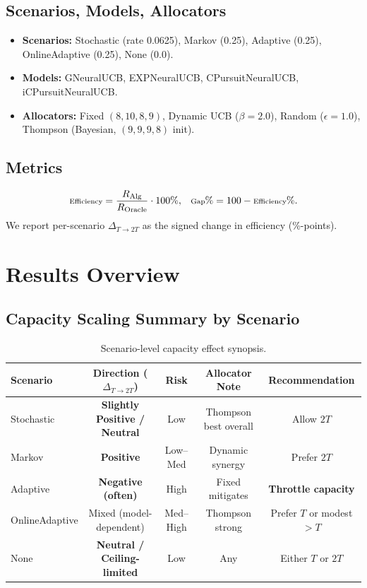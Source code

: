 \documentclass[11pt,a4paper]{article}
\newcommand{\critical}[1]{\textcolor{criticalcolor}{\textbf{#1}}}
\newcommand{\success}[1]{\textcolor{successcolor}{\textbf{#1}}}
\begin{document}
\subsection{Scenarios, Models, Allocators}
\begin{itemize}
    \item \textbf{Scenarios:} Stochastic (rate 0.0625), Markov (0.25), Adaptive (0.25), OnlineAdaptive (0.25), None (0.0).
    \item \textbf{Models:} GNeuralUCB, EXPNeuralUCB, CPursuitNeuralUCB, iCPursuitNeuralUCB.
    \item \textbf{Allocators:} Fixed $(8,10,8,9)$, Dynamic UCB ($\beta\!=\!2.0$), Random ($\epsilon\!=\!1.0$), Thompson (Bayesian, $(9,9,9,8)$ init).
\end{itemize}

\subsection{Metrics}
\begin{equation}
\scriptsize
\text{Efficiency} = \frac{R_{\text{Alg}}}{R_{\text{Oracle}}}\cdot 100\%,\quad
\text{Gap}\% = 100 - \text{Efficiency}\%.
\end{equation}
We report per-scenario \textbf{$\Delta_{T\rightarrow 2T}$} as the signed change in efficiency (\%-points).

\section{Results Overview}

\subsection{Capacity Scaling Summary by Scenario}
\begin{table}[H]
\centering
\scriptsize
\begin{tabular}{lcccc}
\toprule
\textbf{Scenario} & \textbf{Direction ($\Delta_{T\rightarrow 2T}$)} & \textbf{Risk} & \textbf{Allocator Note} & \textbf{Recommendation}\\
\midrule
Stochastic & \success{Slightly Positive / Neutral} & Low & Thompson best overall & Allow $2T$ \\
Markov & \success{Positive} & Low--Med & Dynamic synergy & Prefer $2T$ \\
Adaptive & \critical{Negative (often)}} & High & Fixed mitigates & \textbf{Throttle capacity} \\
OnlineAdaptive & Mixed (model-dependent) & Med--High & Thompson strong & Prefer $T$ or modest $>T$ \\
None & \success{Neutral / Ceiling-limited} & Low & Any & Either $T$ or $2T$ \\
\bottomrule
\end{tabular}
\caption{Scenario-level capacity effect synopsis.}
\end{table}
\end{document}
